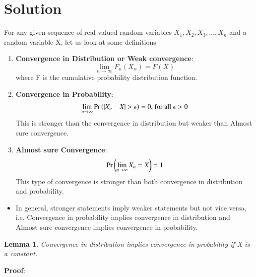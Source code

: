 \documentclass[journal,12pt,twocolumn]{IEEEtran}
\newtheorem{lemma}[theorem]{Lemma}
\begin{document}
\section{\textbf{Solution}}
For any given sequence of real-valued random variables $X_1,X_2,X_3, \dots ,X_n$ and a random variable X, let us look at some definitions
\begin{enumerate}
    \item \textbf{Convergence in Distribution or Weak convergence}:
\begin{equation}
    \lim_{n \rightarrow \infty} F_n(X_n) = F(X)
\end{equation}
where F is the cumulative probability distribution function.
\item \textbf{Convergence in Probability}:
\begin{align}
    \lim_{n \rightarrow \infty} \Pr\left(|X_n - X| > \epsilon\right) = 0 \text{, for all } \epsilon > 0
\end{align}
This is stronger than the convergence in distribution but weaker than Almost sure convergence.
\item \textbf{Almost sure Convergence}:
\begin{align}
  \Pr\left(\lim_{n \rightarrow \infty} X_n = X\right) = 1  
\end{align}
This type of convergence is stronger than both convergence in distribution and probability.
\end{enumerate}
\begin{itemize}
    \item In general, stronger statements imply weaker statements but not vice versa, i.e. Convergence in probability implies convergence in distribution and Almost sure convergence implies convergence in probability.\newline
\end{itemize}
\begin{lemma} Convergence in distribution implies convergence in probability if X is a constant.\end{lemma}
    \textbf{Proof}:
\end{document}
